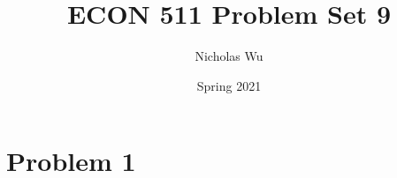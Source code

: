 \documentclass[10pt,letter]{article}
\newcommand{\problem}[1]{\section*{Problem #1}}
\begin{document}


\title{ECON 511 Problem Set 9}

\author{Nicholas Wu}

\date{Spring 2021}

\maketitle

\problem{1}
\end{document}
